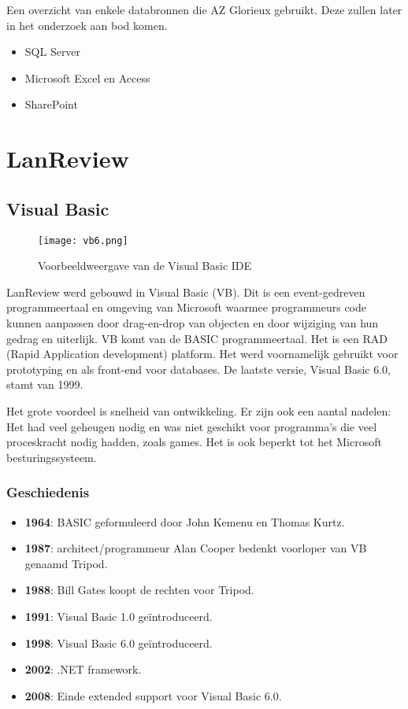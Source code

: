 Een overzicht van enkele databronnen die AZ Glorieux gebruikt. Deze zullen later in het onderzoek aan bod komen.

\begin{itemize}
    \item SQL Server
    \item Microsoft Excel en Access
    \item SharePoint
\end{itemize}

\section{LanReview}

\subsection{Visual Basic}

\begin{figure}[h!]
    \texttt{[image: vb6.png]}
    \caption{Voorbeeldweergave van de Visual Basic IDE \autocite{Speed2020}}
    \label{fig:vb6ide}
\end{figure}

LanReview werd gebouwd in Visual Basic (VB). Dit is een event-gedreven programmeertaal en omgeving van Microsoft waarmee programmeurs code kunnen aanpassen door drag-en-drop van objecten en door wijziging van hun gedrag en uiterlijk. VB komt van de BASIC programmeertaal. Het is een RAD (Rapid Application development) platform. Het werd voornamelijk gebruikt voor prototyping en als front-end voor databases. De laatste versie, Visual Basic 6.0, stamt van 1999.

Het grote voordeel is snelheid van ontwikkeling. Er zijn ook een aantal nadelen:
Het had veel geheugen nodig en was niet geschikt voor programma's die veel proceskracht nodig hadden, zoals games. Het is ook beperkt tot het Microsoft besturingssysteem.

\autocite{Rouse2019}

\subsubsection{Geschiedenis}

\begin{itemize}
    \item \textbf{1964}: BASIC geformuleerd door John Kemenu en Thomas Kurtz.
    \item \textbf{1987}: architect/programmeur Alan Cooper bedenkt voorloper van VB genaamd Tripod.
    \item \textbf{1988}: Bill Gates koopt de rechten voor Tripod.
    \item \textbf{1991}: Visual Basic 1.0 geïntroduceerd.
    \item \textbf{1998}: Visual Basic 6.0 geïntroduceerd.
    \item \textbf{2002}: .NET framework.
    \item \textbf{2008}: Einde extended support voor Visual Basic 6.0.
\end{itemize} \autocite{Grigonis2014}


